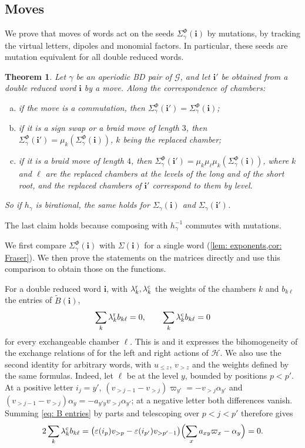 \documentclass[a4paper]{amsart}
\numberwithin{equation}{section}
\newtheorem{theorem}{Theorem}[section]
\theoremstyle{definition}
\theoremstyle{remark}
\newcommand{\mcG}{\mathcal{G}}
\newcommand{\mcH}{\mathcal{H}}
\newcommand{\bfi}{\mathbf{i}}
\newcommand{\tB}{\widetilde{B}}
\newcommand{\rr}{{\rm r}}
\newcommand{\cc}{{\rm c}}
\begin{document}
\subsection{Moves}
\label{sec: moves}
We prove that moves of words act on the seeds $\Sigma^\Phi_\gamma(\bfi)$ by mutations, by tracking the virtual letters, dipoles and monomial factors.
In particular, these seeds are mutation equivalent for all double reduced words.

\begin{theorem}
  \label{thm: moves}
  Let $\gamma$ be an aperiodic BD pair of $\mcG$, and let $\bfi'$ be obtained from a double reduced word $\bfi$ by a move.
  Along the correspondence of chambers:
  \begin{enumerate}[(a)]
    \item if the move is a commutation, then $\Sigma^\Phi_\gamma(\bfi')=\Sigma^\Phi_\gamma(\bfi)$;
    \item if it is a sign swap or a braid move of length $3$, then $\Sigma^\Phi_\gamma(\bfi')=\mu_k(\Sigma^\Phi_\gamma(\bfi))$, $k$ being the replaced chamber;
    \item if it is a braid move of length $4$, then $\Sigma^\Phi_\gamma(\bfi')=\mu_k\mu_\ell\mu_k(\Sigma^\Phi_\gamma(\bfi))$, where $k$ and $\ell$ are the replaced chambers at the levels of the long and of the short root, and the replaced chambers of $\bfi'$ correspond to them by level.
  \end{enumerate}
  So if $h_\gamma$ is birational, the same holds for $\Sigma_\gamma(\bfi)$ and $\Sigma_\gamma(\bfi')$.
\end{theorem}
The last claim holds because composing with $h_\gamma^{-1}$ commutes with mutations.

We first compare $\Sigma^\Phi_\gamma(\bfi)$ with $\Sigma(\bfi)$ for a single word (\cref{lem: exponents,cor: Fraser}). We then prove the statements on the matrices directly and use this comparison to obtain those on the functions.

For a double reduced word $\bfi$, with $\lambda^\rr_k,\lambda^\cc_k$ the weights of the chambers $k$ and $b_{k\ell}$ the entries of $\tB(\bfi)$,
\begin{equation}
  \label{eq: homogeneity}
  \sum_k\lambda^\rr_k b_{k\ell}=0,
  \qquad
  \sum_k\lambda^\cc_k b_{k\ell}=0
\end{equation}
for every exchangeable chamber $\ell$.
This is \cite[Lemma~4.22]{GSV10} and it expresses the bihomogeneity of the exchange relations of \cite{BFZ05} for the left and right actions of $\mcH$.
We also use the second identity for arbitrary words, with $u_{\le z}$, $v_{>z}$ and the weights defined by the same formulas.
Indeed, let $\ell$ be at the level $y$, bounded by positions $p<p'$.
At a positive letter $i_j=y'$, $(v_{>j-1}-v_{>j})\varpi_{y'}=-v_{>j}\alpha_{y'}$ and $(v_{>j-1}-v_{>j})\alpha_y=-a_{y'y}v_{>j}\alpha_{y'}$; at a negative letter both differences vanish.
Summing \eqref{eq: B entries} by parts and telescoping over $p<j<p'$ therefore gives
\[
  2\sum_k\lambda^\cc_k b_{k\ell}
  =\bigl(\varepsilon(i_p)v_{>p}-\varepsilon(i_{p'})v_{>p'-1}\bigr)
    \Bigl(\sum_x a_{xy}\varpi_x-\alpha_y\Bigr)=0.
\]
\end{document}
